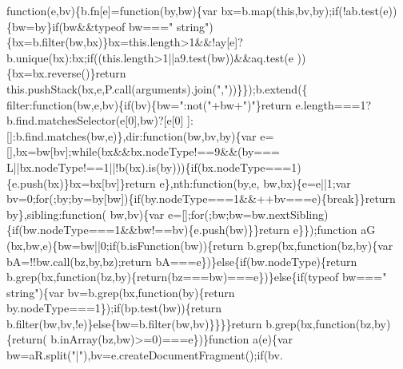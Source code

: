\begin{DoxyCode}
{      function}(e,bv)\{b.fn[e]=\textcolor{keyword}{function}(by,bw)\{var bx=b.map(\textcolor{keyword}{this},bv,by);\textcolor{keywordflow}{if}(!ab.test(e))\{bw=by\}\textcolor{keywordflow}{if}(bw&&typeof bw===\textcolor{stringliteral}{"
      string"})\{bx=b.filter(bw,bx)\}bx=this.length>1&&!ay[e]?b.unique(bx):bx;\textcolor{keywordflow}{if}((this.length>1||a9.test(bw))&&aq.test(e
      ))\{bx=bx.reverse()\}\textcolor{keywordflow}{return} this.pushStack(bx,e,P.call(arguments).join(\textcolor{stringliteral}{","}))\}\});b.extend(\{
      filter:\textcolor{keyword}{function}(bw,e,bv)\{\textcolor{keywordflow}{if}(bv)\{bw=\textcolor{stringliteral}{":not("}+bw+\textcolor{stringliteral}{")"}\}\textcolor{keywordflow}{return} e.length===1?b.find.matchesSelector(e[0],bw)?[e[0]
      ]:[]:b.find.matches(bw,e)\},dir:\textcolor{keyword}{function}(bw,bv,by)\{var e=[],bx=bw[bv];\textcolor{keywordflow}{while}(bx&&bx.nodeType!==9&&(by===
      L||bx.nodeType!==1||!b(bx).is(by)))\{\textcolor{keywordflow}{if}(bx.nodeType===1)\{e.push(bx)\}bx=bx[bv]\}\textcolor{keywordflow}{return} e\},nth:\textcolor{keyword}{function}(by,e,
      bw,bx)\{e=e||1;var bv=0;\textcolor{keywordflow}{for}(;by;by=by[bw])\{\textcolor{keywordflow}{if}(by.nodeType===1&&++bv===e)\{\textcolor{keywordflow}{break}\}\}\textcolor{keywordflow}{return} by\},sibling:\textcolor{keyword}{function}(
      bw,bv)\{var e=[];\textcolor{keywordflow}{for}(;bw;bw=bw.nextSibling)\{\textcolor{keywordflow}{if}(bw.nodeType===1&&bw!==bv)\{e.push(bw)\}\}\textcolor{keywordflow}{return} e\}\});\textcolor{keyword}{function} aG
      (bx,bw,e)\{bw=bw||0;\textcolor{keywordflow}{if}(b.isFunction(bw))\{\textcolor{keywordflow}{return} b.grep(bx,\textcolor{keyword}{function}(bz,by)\{var bA=!!bw.call(bz,by,bz);\textcolor{keywordflow}{return} 
      bA===e\})\}\textcolor{keywordflow}{else}\{\textcolor{keywordflow}{if}(bw.nodeType)\{\textcolor{keywordflow}{return} b.grep(bx,\textcolor{keyword}{function}(bz,by)\{\textcolor{keywordflow}{return}(bz===bw)===e\})\}\textcolor{keywordflow}{else}\{\textcolor{keywordflow}{if}(typeof bw===\textcolor{stringliteral}{"
      string"})\{var bv=b.grep(bx,\textcolor{keyword}{function}(by)\{\textcolor{keywordflow}{return} by.nodeType===1\});\textcolor{keywordflow}{if}(bp.test(bw))\{\textcolor{keywordflow}{return} 
      b.filter(bw,bv,!e)\}\textcolor{keywordflow}{else}\{bw=b.filter(bw,bv)\}\}\}\}\textcolor{keywordflow}{return} b.grep(bx,\textcolor{keyword}{function}(bz,by)\{\textcolor{keywordflow}{return}(
      b.inArray(bz,bw)>=0)===e\})\}\textcolor{keyword}{function} a(e)\{var bw=aR.split(\textcolor{stringliteral}{"|"}),bv=e.createDocumentFragment();\textcolor{keywordflow}{if}(bv.

\end{DoxyCode}
